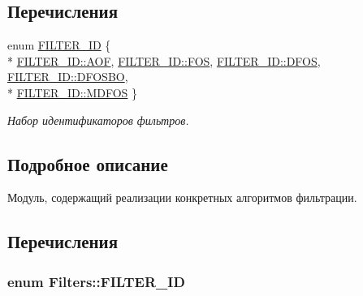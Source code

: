 \subsection*{Перечисления}
\begin{DoxyCompactItemize}
\item 
enum \hyperlink{namespace_filters_a1b615faac44ef992d0af44da40ff26d7}{F\+I\+L\+T\+E\+R\+\_\+\+ID} \{ \\*
\hyperlink{namespace_filters_a1b615faac44ef992d0af44da40ff26d7afb2e0194a4c38c00b93fb1222c7df34a}{F\+I\+L\+T\+E\+R\+\_\+\+I\+D\+::\+A\+OF}, 
\hyperlink{namespace_filters_a1b615faac44ef992d0af44da40ff26d7a12afbc0c8b3d0ec4d03bb3254eec87a0}{F\+I\+L\+T\+E\+R\+\_\+\+I\+D\+::\+F\+OS}, 
\hyperlink{namespace_filters_a1b615faac44ef992d0af44da40ff26d7a7d07d86f2caba0db54a7b3464451b0aa}{F\+I\+L\+T\+E\+R\+\_\+\+I\+D\+::\+D\+F\+OS}, 
\hyperlink{namespace_filters_a1b615faac44ef992d0af44da40ff26d7acbecfce9d58e9013e109cbe14047e9df}{F\+I\+L\+T\+E\+R\+\_\+\+I\+D\+::\+D\+F\+O\+S\+BO}, 
\\*
\hyperlink{namespace_filters_a1b615faac44ef992d0af44da40ff26d7a2c5a562dbfb4545d3fb7270a36bdfcc2}{F\+I\+L\+T\+E\+R\+\_\+\+I\+D\+::\+M\+D\+F\+OS}
 \}\begin{DoxyCompactList}\small\item\em Набор идентификаторов фильтров. \end{DoxyCompactList}
\end{DoxyCompactItemize}


\subsection{Подробное описание}
Модуль, содержащий реализации конкретных алгоритмов фильтрации. 

\subsection{Перечисления}
\subsubsection[{\texorpdfstring{F\+I\+L\+T\+E\+R\+\_\+\+ID}{FILTER_ID}}]{\setlength{\rightskip}{0pt plus 5cm}enum {\bf Filters\+::\+F\+I\+L\+T\+E\+R\+\_\+\+ID}\hspace{0.3cm}{\ttfamily [strong]}}\hypertarget{namespace_filters_a1b615faac44ef992d0af44da40ff26d7}{}\label{namespace_filters_a1b615faac44ef992d0af44da40ff26d7}


